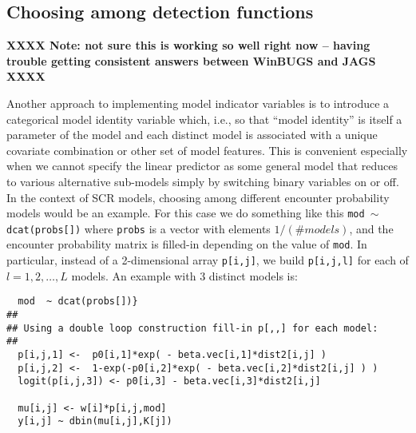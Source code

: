 \subsection{Choosing among detection functions}


{\bf XXXX Note: not sure this is working so well right now -- having
  trouble getting consistent answers between WinBUGS and JAGS XXXX}

Another approach to implementing model indicator variables is to
introduce a categorical model identity variable which, i.e., so that
``model identity'' is itself a parameter of the model and each
distinct model is associated with a unique covariate combination or
other set of model features. This is convenient especially when we
cannot specify the linear predictor as some general model that reduces
to various alternative sub-models simply by switching binary variables
on or off. In the context of SCR models, choosing among different
encounter probability models would be an example.  For this case we do
something like this \mbox{\tt mod  $\sim$  dcat(probs[])}
where \mbox{\tt probs} is a vector with elements $1/(\# models)$, and
the encounter probability matrix is filled-in depending on the value
 of \mbox{\tt mod}.
In particular, instead of a 2-dimensional array
 \mbox{\tt p[i,j]},  we build \mbox{\tt p[i,j,l]} for each of
$l=1,2,\ldots,L$ models. An example with 3 distinct models is:
{\small
\begin{verbatim}
  mod  ~ dcat(probs[])}
##
## Using a double loop construction fill-in p[,,] for each model:
##
  p[i,j,1] <-  p0[i,1]*exp( - beta.vec[i,1]*dist2[i,j] )
  p[i,j,2] <-  1-exp(-p0[i,2]*exp( - beta.vec[i,2]*dist2[i,j] ) )
  logit(p[i,j,3]) <- p0[i,3] - beta.vec[i,3]*dist2[i,j]

  mu[i,j] <- w[i]*p[i,j,mod]
  y[i,j] ~ dbin(mu[i,j],K[j])
\end{verbatim}
}

